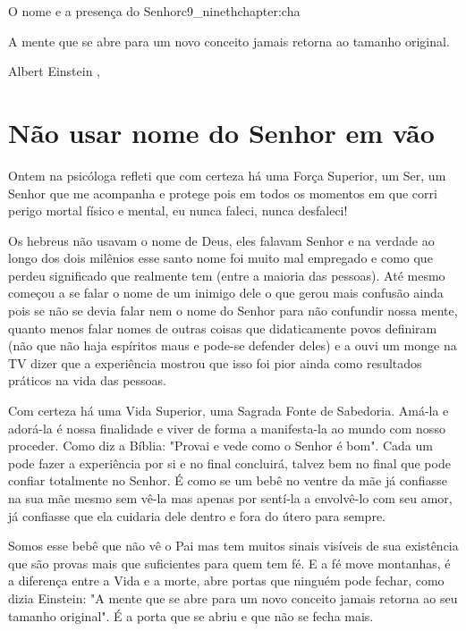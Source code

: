 \begin{chapterpage}{O nome e a presença do Senhor}{c9_ninethchapter:cha}

\begin{myquotation} A mente que se abre para um novo conceito jamais retorna ao tamanho original.

\par\vspace*{15mm}
\mbox{}\hfill \emdash{}Albert Einstein 
, %
\par\end{myquotation}

\end{chapterpage}



\section{Não usar nome do Senhor em vão}\label{c1_basicformatting:sec}

\emdash{}Ontem na psicóloga refleti que com certeza há uma Força Superior, um Ser, um Senhor que me acompanha e protege pois em todos os momentos em que corri perigo mortal físico e mental, eu nunca faleci, nunca desfaleci!

\emdash{}Os hebreus não usavam o nome de Deus, eles falavam Senhor e na verdade ao longo dos dois milênios esse santo nome foi muito mal empregado e como que perdeu significado que realmente tem (entre a maioria das pessoas). Até mesmo começou a se falar o nome de um inimigo dele o que gerou mais confusão ainda pois se não se devia falar nem o nome do Senhor para não confundir nossa mente, quanto menos falar nomes de outras coisas que didaticamente povos definiram (não que não haja espíritos maus e pode-se defender deles) e a ouvi um monge na TV dizer que a experiência mostrou que isso foi pior ainda como resultados práticos na vida das pessoas.

\emdash{}Com certeza há uma Vida Superior, uma Sagrada Fonte de Sabedoria. Amá-la e adorá-la é nossa finalidade e viver de forma a manifesta-la ao mundo com nosso proceder.
Como diz a Bíblia: "Provai e vede como o Senhor é bom". Cada um pode fazer a experiência por si e no final concluirá, talvez bem no final que pode confiar totalmente no Senhor. É como se um bebê no ventre da mãe já confiasse na sua mãe mesmo sem vê-la mas apenas por sentí-la a envolvê-lo com seu amor, já confiasse que ela cuidaria dele dentro e fora do útero para sempre. 

\emdash{}Somos esse bebê que não vê o Pai mas tem muitos sinais visíveis de sua existência que são provas mais que suficientes para quem tem fé. E a fé move montanhas, é a diferença entre a Vida e a morte, abre portas que ninguém pode fechar, como dizia Einstein: "A mente que se abre para um novo conceito jamais retorna ao seu tamanho original". É a porta que se abriu e que não se fecha mais.